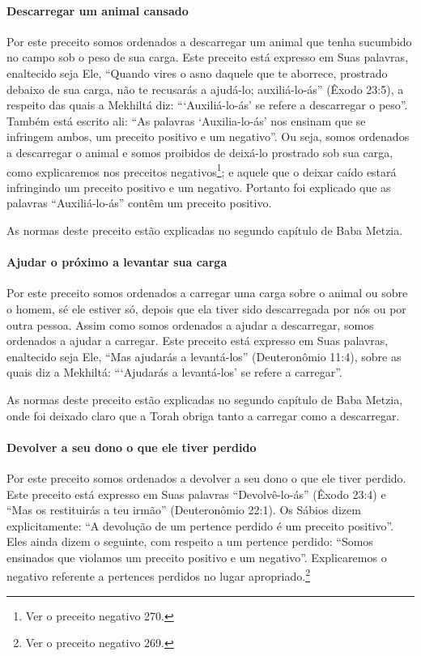 \paragraph{Descarregar um animal cansado}

Por este preceito somos ordenados a descarregar um animal que tenha
sucumbido no campo sob o peso de sua carga. Este preceito está expresso
em Suas palavras, enaltecido seja Ele, ``Quando vires o asno daquele que
te aborrece, prostrado debaixo de sua carga, não te recusarás a
ajudá-lo; auxiliá-lo-ás'' (Êxodo 23:5), a respeito das quais a Mekhiltá
diz: ```Auxiliá-lo-ás' se refere a descarregar o peso''. Também está
escrito ali: ``As palavras `Auxilia-lo-ás' nos ensinam que se infringem
ambos, um preceito positivo e um negativo''. Ou seja, somos ordenados a
descarregar o animal e somos proibidos de deixá-lo prostrado sob sua
carga, como explicaremos nos preceitos negativos\footnote{Ver o preceito negativo 270.};
e aquele que o deixar caído estará infringindo um preceito positivo e um
negativo. Portanto foi explicado que as palavras ``Auxiliá-lo-ás''
contêm um preceito positivo.

As normas deste preceito estão explicadas no segundo capítulo de Baba Metzia.

\paragraph{Ajudar o próximo a levantar sua carga}

Por este preceito somos ordenados a carregar uma carga sobre o animal
ou sobre o homem, sé ele estiver só, depois que ela tiver sido
descarregada por nós ou por outra pessoa. Assim como somos ordenados a
ajudar a descarregar, somos ordenados a ajudar a carregar. Este
preceito está expresso em Suas palavras, enaltecido seja Ele, ``Mas
ajudarás a levantá-los'' (Deuteronômio 11:4), sobre as quais diz a
Mekhiltá: ```Ajudarás a levantá-los' se refere a carregar''.

As normas deste preceito estão explicadas no segundo capítulo de Baba
Metzia, onde foi deixado claro que a Torah obriga tanto a carregar como
a descarregar.

\paragraph{Devolver a seu dono o que ele tiver perdido}

Por este preceito somos ordenados a devolver a seu dono o que ele tiver
perdido. Este preceito está expresso em Suas palavras ``Devolvê-lo-ás''
(Êxodo 23:4) e ``Mas os restituirás a teu irmão'' (Deuteronômio 22:1).
Os Sábios dizem explicitamente: ``A devolução de um pertence perdido é
um preceito positivo''. Eles ainda dizem o seguinte, com respeito a um
pertence perdido: ``Somos ensinados que violamos um preceito positivo e
um negativo''. Explicaremos o negativo referente a pertences perdidos no lugar apropriado.\footnote{Ver o preceito negativo 269.}

